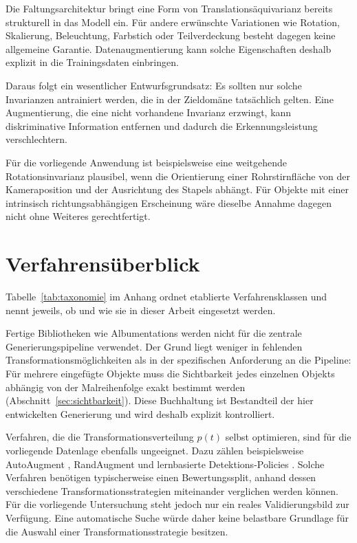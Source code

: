 Die Faltungsarchitektur bringt eine Form von Translationsäquivarianz bereits strukturell in das Modell ein. Für andere erwünschte Variationen wie Rotation, Skalierung, Beleuchtung, Farbstich oder Teilverdeckung besteht dagegen keine allgemeine Garantie. Datenaugmentierung kann solche Eigenschaften deshalb explizit in die Trainingsdaten einbringen.

Daraus folgt ein wesentlicher Entwurfsgrundsatz: Es sollten nur solche Invarianzen antrainiert werden, die in der Zieldomäne tatsächlich gelten. Eine Augmentierung, die eine nicht vorhandene Invarianz erzwingt, kann diskriminative Information entfernen und dadurch die Erkennungsleistung verschlechtern.

Für die vorliegende Anwendung ist beispielsweise eine weitgehende Rotationsinvarianz plausibel, wenn die Orientierung einer Rohrstirnfläche von der Kameraposition und der Ausrichtung des Stapels abhängt. Für Objekte mit einer intrinsisch richtungsabhängigen Erscheinung wäre dieselbe Annahme dagegen nicht ohne Weiteres gerechtfertigt.

\section{Verfahrensüberblick}
\label{sec:augtaxonomie}

Tabelle~\ref{tab:taxonomie} im Anhang ordnet etablierte Verfahrensklassen und nennt jeweils, ob und wie sie in dieser Arbeit eingesetzt werden.

Fertige Bibliotheken wie Albumentations \parencite{buslaev2020} werden nicht für die zentrale Generierungspipeline verwendet. Der Grund liegt weniger in fehlenden Transformationsmöglichkeiten als in der spezifischen Anforderung an die Pipeline: Für mehrere eingefügte Objekte muss die Sichtbarkeit jedes einzelnen Objekts abhängig von der Malreihenfolge exakt bestimmt werden (Abschnitt~\ref{sec:sichtbarkeit}). Diese Buchhaltung ist Bestandteil der hier entwickelten Generierung und wird deshalb explizit kontrolliert.

Verfahren, die die Transformationsverteilung $p(t)$ selbst optimieren, sind für die vorliegende Datenlage ebenfalls ungeeignet. Dazu zählen beispielsweise AutoAugment \parencite{cubuk2019}, RandAugment \parencite{cubuk2020} und lernbasierte Detektions-Policies \parencite{zoph2020}. Solche Verfahren benötigen typischerweise einen Bewertungssplit, anhand dessen verschiedene Transformationsstrategien miteinander verglichen werden können. Für die vorliegende Untersuchung steht jedoch nur ein reales Validierungsbild zur Verfügung. Eine automatische Suche würde daher keine belastbare Grundlage für die Auswahl einer Transformationsstrategie besitzen.

